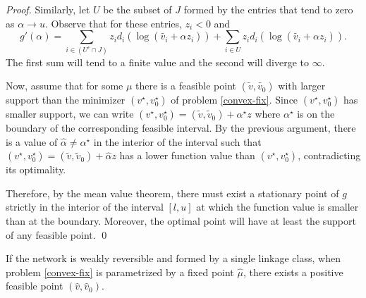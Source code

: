 \documentclass[smallextended]{svjour3}       %
\newcommand*{\0}{\mathbf{0}}
\newcommand*{\1}{\mathbf{1}}
\begin{document}
\begin{proof}
	Similarly, let $U$ be the subset of $J$ formed by the entries that tend to zero as 
	$\alpha\rightarrow u$. Observe that for these entries, $z_i<0$ and
  \[
    g'(\alpha) = \sum_{i\in (U^c\cap J)} z_i d_i(\log{(\tilde{v_i}+\alpha z_i)})
               + \sum_{i\in U}   z_i d_i(\log{(\tilde{v_i}+\alpha z_i)}).
  \]
	The first sum will tend to a finite value and the second will diverge to
	$\infty$. 
	
	Now, assume that for some $\mu$ there is a feasible point
	$(\tilde{v},\tilde{v_0})$ with larger support than the minimizer
	$(v^\star,v^\star_0)$ of problem \eqref{convex-fix}.  Since
	$(v^\star,v_0^\star)$ has smaller support, we can write  $(v^\star,
	v_0^\star) = (\tilde{v},\tilde{v}_0) + \alpha^\star z$ where $\alpha^\star$
	is on the boundary of the corresponding feasible interval.  By the
	previous argument, there is a value of $\hat \alpha \neq \alpha^\star$ in the
	interior of the interval such that $(v^\star, v_0^\star) =
	(\tilde{v},\tilde{v}_0) + \hat \alpha z$ has a lower function value than
	$(v^\star,v^\star_0)$, contradicting its optimality.

	Therefore, by the mean value theorem, there must exist a stationary point of
	$g$ strictly in the interior of the interval $[l,u]$ at which the function
	value is smaller than at the boundary.  Moreover, the optimal point will have
	at least the support of any feasible point.  
   \qed
\end{proof}



\begin{lemma}
	If the network is weakly reversible and formed by a single linkage class, when problem
	\eqref{convex-fix} is parametrized by a fixed point $\hat\mu$,  there
	exists a positive feasible point $(\hat v,\hat v_0)$.
\label{positive-feasible}
\end{lemma}
\end{document}
